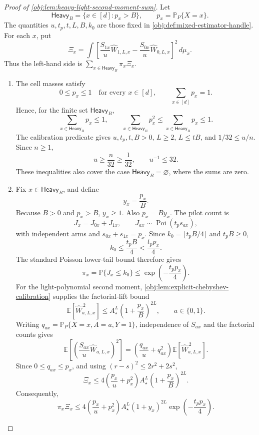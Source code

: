\begin{proof}[Proof of \cref{obj:lem:heavy-light-second-moment-sum}]
Let
\[
\mathsf{Heavy}_B=\{x\in[d]:p_x>B\},
\qquad
p_x=\mathbb P_P\{X=x\}.
\]
The quantities \(u,t_p,t,L,B,k_0\) are those fixed in \cref{obj:def:mixed-estimator-handle}. For each \(x\), put
\[
\Xi_x
=
\int
\left[
\frac{S_{1x}}u\widehat W_{1,L,x}
-
\frac{S_{0x}}u\widehat W_{0,L,x}
\right]^2\,d\mu_x .
\]
Thus the left-hand side is \(\sum_{x\in\mathsf{Heavy}_B}\pi_x\Xi_x\).

\begin{enumerate}
\item The cell masses satisfy
\[
0\le p_x\le1
\quad\text{for every }x\in[d],
\qquad
\sum_{x\in[d]}p_x=1.
\]
Hence, for the finite set \(\mathsf{Heavy}_B\),
\[
\sum_{x\in\mathsf{Heavy}_B}p_x\le1,
\qquad
\sum_{x\in\mathsf{Heavy}_B}p_x^2
\le
\sum_{x\in\mathsf{Heavy}_B}p_x
\le1.
\]
The calibration predicate gives \(u,t_p,t,B>0\), \(L\ge2\), \(L\le tB\), and \(1/32\le u/n\). Since \(n\ge1\),
\[
u\ge \frac n{32}\ge \frac1{32},
\qquad
u^{-1}\le32.
\]
These inequalities also cover the case \(\mathsf{Heavy}_B=\varnothing\), where the sums are zero. %

\item Fix \(x\in\mathsf{Heavy}_B\), and define
\[
y_x=\frac{p_x}{B}.
\]
Because \(B>0\) and \(p_x>B\), \(y_x\ge1\). Also \(p_x=By_x\). The pilot count is
\[
J_x=J_{0x}+J_{1x},
\qquad
J_{ax}\sim\operatorname{Poi}(t_ps_{ax}),
\]
with independent arms and \(s_{0x}+s_{1x}=p_x\). Since \(k_0=\lfloor t_pB/4\rfloor\) and \(t_pB\ge0\),
\[
k_0\le \frac{t_pB}{4}<\frac{t_pp_x}{4}.
\]
The standard Poisson lower-tail bound therefore gives
\[
\pi_x
=
\mathbb P\{J_x\le k_0\}
\le
\exp\!\left(-\frac{t_pp_x}{4}\right).
\]
For the light-polynomial second moment, \cref{obj:lem:explicit-chebyshev-calibration} supplies the factorial-lift bound
\[
\mathbb E\!\left[\widehat W_{a,L,x}^{\,2}\right]
\le
A_\star^L\left(1+\frac{p_x}{B}\right)^{2L},
\qquad a\in\{0,1\}.
\]
Writing \(q_{ax}=\mathbb P_P\{X=x,A=a,Y=1\}\), independence of \(S_{ax}\) and the factorial counts gives
\[
\mathbb E\!\left[
\left(\frac{S_{ax}}u\widehat W_{a,L,x}\right)^2
\right]
=
\left(\frac{q_{ax}}u+q_{ax}^2\right)
\mathbb E\!\left[\widehat W_{a,L,x}^{\,2}\right].
\]
Since \(0\le q_{ax}\le p_x\), and using \((r-s)^2\le2r^2+2s^2\),
\[
\Xi_x
\le
4\left(\frac{p_x}{u}+p_x^2\right)
A_\star^L\left(1+\frac{p_x}{B}\right)^{2L}.
\]
Consequently,
\[
\pi_x\Xi_x
\le
4\left(\frac{p_x}{u}+p_x^2\right)
A_\star^L(1+y_x)^{2L}
\exp\!\left(-\frac{t_pp_x}{4}\right).
\] %


\end{enumerate}
\end{proof}

